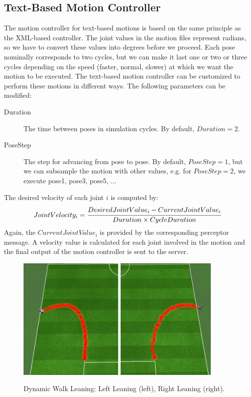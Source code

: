 \subsection{Text-Based Motion Controller}
The motion controller for text-based motions is based on the same principle as the XML-based controller. The joint values in the motion files represent radians, so we have to convert these values into degrees before we proceed. Each pose nominally corresponds to two cycles, but we can make it last one or two or three cycles depending on the speed (faster, normal, slower) at which we want the motion to be executed. The text-based motion controller can be customized to perform these motions in different ways. The following parameters can be modified:
\begin{description}
	\item[Duration] The time between poses in simulation cycles. By default, $Duration=2$.
	\item[PoseStep] The step for advancing from pose to pose. By default, $PoseStep=1$, but we can subsample the motion with other values, e.g. for $PoseStep=2$, we execute pose1, pose3, pose5, ...
\end{description}
The desired velocity of each joint $i$ is computed by:
\[
JointVelocity_i = \cfrac {Desired Joint Value_i - Current Joint Value_i} {Duration \times CycleDuration}
\]
Again, the $CurrentJointValue_i$ is provided by the corresponding perceptor message.
A velocity value is calculated for each joint involved in the motion and the final output of the motion controller is sent to the server. 

\begin{figure}[t!]
\centering
  \includegraphics[height=6cm]{Chapter3/figures/leanLeft.png}\quad\quad\quad\quad
  \includegraphics[height=6cm]{Chapter3/figures/leanRight.png}
  \caption{Dynamic Walk Leaning: Left Leaning (left), Right Leaning (right).}
  \label{fig:Lean}
\end{figure}

